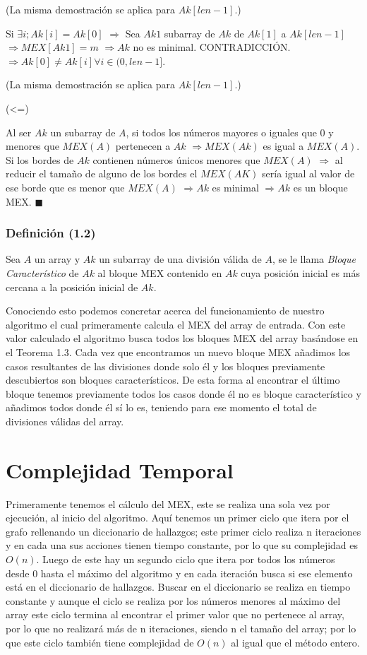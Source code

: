 \documentclass{article}
\begin{document}
(La misma demostración se aplica para $Ak[len -1]$.)

Si $\exists i; Ak[i] = Ak[0]$ $\Rightarrow$ Sea $Ak1$ subarray de $Ak$ de $Ak[1]$ a $Ak[len -1]$ $\Rightarrow MEX[Ak1] = m$ $\Rightarrow Ak$ no es minimal. CONTRADICCIÓN. $\Rightarrow Ak[0] \neq Ak[i] \forall i \in (0, len-1]$.

(La misma demostración se aplica para $Ak[len -1]$.)

(<=)

Al ser $Ak$ un subarray de $A$, si todos los números mayores o iguales que 0 y menores que $MEX(A)$ pertenecen a $Ak$ $\Rightarrow MEX(Ak)$ es igual a $MEX(A)$. Si los bordes de $Ak$ contienen números únicos menores que $MEX(A)$ $\Rightarrow$ al reducir el tamaño de alguno de los bordes el $MEX(AK)$ sería igual al valor de ese borde que es menor que $MEX(A)$ $\Rightarrow Ak$ es minimal $\Rightarrow Ak$ es un bloque MEX. $\blacksquare$

\subsubsection*{Definición (1.2)}

Sea $A$ un array y $Ak$ un subarray de una división válida de $A$, se le llama \textit{Bloque Característico} de $Ak$ al bloque MEX contenido en $Ak$ cuya posición inicial es más cercana a la posición inicial de $Ak$.

Conociendo esto podemos concretar acerca del funcionamiento de nuestro algoritmo el cual primeramente calcula el MEX del array de entrada. Con este valor calculado el algoritmo busca todos los bloques MEX del array basándose en el Teorema 1.3. Cada vez que encontramos un nuevo bloque MEX añadimos los casos resultantes de las divisiones donde solo él y los bloques previamente descubiertos son bloques característicos. De esta forma al encontrar el último bloque tenemos previamente todos los casos donde él no es bloque característico y añadimos todos donde él sí lo es, teniendo para ese momento el total de divisiones válidas del array.

\section*{Complejidad Temporal}

Primeramente tenemos el cálculo del MEX, este se realiza una sola vez por ejecución, al inicio del algoritmo. Aquí tenemos un primer ciclo que itera por el grafo rellenando un diccionario de hallazgos; este primer ciclo realiza n iteraciones y en cada una sus acciones tienen tiempo constante, por lo que su complejidad es $O(n)$. Luego de este hay un segundo ciclo que itera por todos los números desde 0 hasta el máximo del algoritmo y en cada iteración busca si ese elemento está en el diccionario de hallazgos. Buscar en el diccionario se realiza en tiempo constante y aunque el ciclo se realiza por los números menores al máximo del array este ciclo termina al encontrar el primer valor que no pertenece al array, por lo que no realizará más de n iteraciones, siendo n el tamaño del array; por lo que este ciclo también tiene complejidad de $O(n)$ al igual que el método entero.
\end{document}
